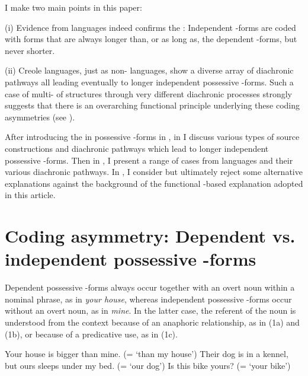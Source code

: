 \documentclass[output=paper]{langsci/langscibook}
\begin{document}
I make two main points in this paper:

(i) Evidence from  languages indeed confirms the : Independent -forms are coded with forms that are always longer than, or as long as, the dependent -forms, but never shorter.

(ii) Creole languages, just as non- languages, show a diverse array of diachronic pathways all leading eventually to longer independent possessive -forms. Such a case of multi- of structures through very different diachronic processes strongly suggests that there is an overarching functional  principle underlying these coding asymmetries (see ). 

After introducing the  in possessive -forms in , in  I discuss various types of source constructions and diachronic pathways which lead to longer independent possessive -forms. Then in , I present a range of cases from  languages and their various diachronic pathways. In , I consider but ultimately reject some alternative explanations against the background of the functional -based explanation adopted in this article. 

\section{Coding asymmetry: Dependent vs. independent possessive -forms}\label{sec:michaelis:2} 

Dependent possessive -forms always occur together with an overt noun within a nominal phrase, as in \textit{your house}, whereas independent possessive -forms occur without an overt noun, as in \textit{mine}. In the latter case, the referent of the noun is understood from the context because of an anaphoric relationship, as in (1a) and (1b), or because of a predicative use, as in (1c).  

\ea
{}
\ea
Your house is bigger than mine. (= ‘than my house’)
\ex
 Their dog is in a kennel, but ours sleeps under my bed. (= ‘our dog’)
\ex 
 Is this bike yours? (= ‘your bike’)
\z
\z
\end{document}
